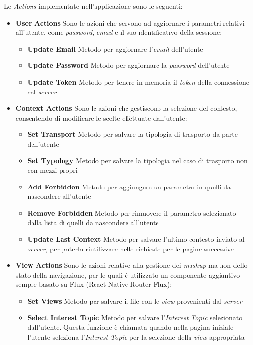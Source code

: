 Le \emph{Actions} implementate nell'applicazione sono le seguenti:

\begin{itemize}
	\item \textbf{User Actions}
	Sono le azioni che servono ad aggiornare i parametri relativi all'utente, come \emph{password}, \emph{email} e il suo identificativo della sessione:
	\begin{itemize}
		\item \textbf{Update Email}
		Metodo per aggiornare l'\emph{email} dell'utente 
		\item \textbf{Update Password}
		Metodo per aggiornare la \emph{password} dell'utente
		\item \textbf{Update Token}
		Metodo per tenere in memoria il \emph{token} della connessione col \emph{server}
	\end{itemize}
	\item \textbf{Context Actions}
	Sono le azioni che gestiscono la selezione del contesto, consentendo di modificare le scelte effettuate dall'utente:
	\begin{itemize}
		\item \textbf{Set Transport}
		Metodo per salvare la tipologia di trasporto da parte dell'utente
		\item \textbf{Set Typology}
		Metodo per salvare la tipologia nel caso di trasporto non con mezzi propri
		\item \textbf{Add Forbidden}
		Metodo per aggiungere un parametro in quelli da nascondere all'utente
		\item \textbf{Remove Forbidden}
		Metodo per rimuovere il parametro selezionato dalla lista di quelli da nascondere all'utente
		\item \textbf{Update Last Context}
		Metodo per salvare l'ultimo contesto inviato al \emph{server}, per poterlo riutilizzare nelle richieste per le pagine successive
	\end{itemize}
	\item \textbf{View Actions}
	Sono le azioni relative alla gestione dei \emph{mashup} ma non dello stato della navigazione, per le quali è utilizzato un componente aggiuntivo sempre basato su Flux (React Native Router Flux):
	\begin{itemize}
		\item \textbf{Set Views}
		Metodo per salvare il file con le \emph{view} provenienti dal \emph{server} 
		\item \textbf{Select Interest Topic}
		Metodo per salvare l'\emph{Interest Topic} selezionato dall'utente. Questa funzione è chiamata quando nella pagina iniziale l'utente seleziona l'\emph{Interest Topic} per la selezione della \emph{view} appropriata
	\end{itemize}
	

\end{itemize}
